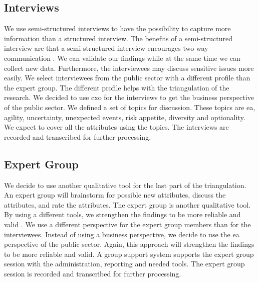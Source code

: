 \subsection{Interviews}
\label{sub:interviews}
We use semi-structured interviews to have the possibility to capture more information than a structured interview. The benefits of a semi-structured interview are that a semi-structured interview encourages two-way communication \parencite[pp.~87--88]{Recker2012}. We can validate our findings while at the same time we can collect new data. Furthermore, the interviewees may discuss sensitive issues more easily. We select interviewees from the public sector with a different profile than the expert group. The different profile helps with the triangulation of the research. We decided to use \gls{cxo} for the interviews to get the business perspective of the public sector. We defined a set of topics for discussion. These topics are \acrlong{ea}, \gls{agility}, \gls{uncertainty}, unexpected events, risk appetite, \gls{diversity} and \gls{optionality}. We expect to cover all the attributes using the topics. The interviews are recorded and transcribed for further processing.

\subsection{Expert Group}
\label{sub:expertgroup}
We decide to use another qualitative tool for the last part of the \gls{triangulation}. An expert group will brainstorm for possible new \glspl{attribute}, discuss the \glspl{attribute}, and rate the \glspl{attribute}. The expert group is another qualitative tool. By using a different tools, we strengthen the findings to be more reliable and valid \parencite[p.~88]{Recker2012}. We use a different perspective for the expert group members than for the interviewees. Instead of using a business perspective, we decide to use the \acrlong{ea} perspective of the public sector. Again, this approach will strengthen the findings to be more reliable and valid. A group support system supports the expert group session with the administration, reporting and needed tools. The expert group session is recorded and transcribed for further processing.

